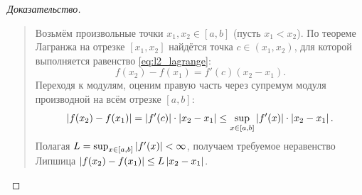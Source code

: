 \begin{proof}[Доказательство]~\\
    \begin{quote}
        Возьмём произвольные точки $x_1, x_2 \in [a, b]$ (пусть $x_1 < x_2$).
        По теореме Лагранжа на отрезке $[x_1, x_2]$ найдётся точка
        $c \in (x_1, x_2)$, для которой выполняется равенство
        \eqref{eq:l2_lagrange}:
        \[
            f(x_2) - f(x_1) = f'(c)(x_2 - x_1).
        \]
        Переходя к модулям, оценим правую часть через супремум модуля
        производной на всём отрезке $[a, b]$:
        \[
            \left| f(x_2) - f(x_1) \right| = \left| f'(c) \right| \cdot \left| x_2 - x_1 \right| \le
            \sup_{x \in [a, b]} \left| f'(x) \right| \cdot \left| x_2 - x_1 \right|.
        \]
        Полагая $L = \sup_{x \in [a, b]} \left| f'(x) \right| < \infty$, получаем
        требуемое неравенство Липшица $\left| f(x_2) - f(x_1) \right| \le L \left| x_2 - x_1 \right|$.
    \end{quote}
\end{proof}

